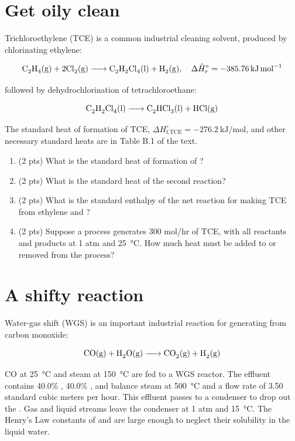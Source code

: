 \documentclass[11pt]{article}
\begin{document}
\section{Get oily clean}
\label{sec-3}
Trichloroethylene (TCE) is a common industrial cleaning solvent, produced by chlorinating ethylene:

\[\ce{C2H4 (g) + 2 Cl2 (g) -> C2H2Cl4 (l) + H2 (g)},\quad \Delta \hat{H}^{\circ}_{r} = \SI{-385.76}{\kilo\joule\per\mole} \]

\noindent followed by dehydrochlorination of tetrachloroethane:

\[ \ce{C2H2Cl4 (l) -> C2HCl3 (l) + HCl (g)}\]

\noindent The standard heat of formation of TCE, \(\Delta H^{\circ}_\text{f,TCE} = \SI{-276.2}{\kilo\joule\per\mole} \), and other necessary standard heats are in Table B.1 of the text.

\begin{enumerate}
\item (2 pts) What is the standard heat of formation of ?
\item (2 pts) What is the standard heat of the second reaction?
\item (2 pts) What is the standard enthalpy of the net reaction for making TCE from ethylene and ?
\item (2 pts) Suppose a process generates 300 mol/hr of TCE, with all reactants and products at 1 atm and \SI{25}{\celsius}.  How much heat must be added to or removed from the process?
\end{enumerate}
\section{A shifty reaction}
\label{sec-4}
Water-gas shift (WGS) is an important industrial reaction for generating  from carbon monoxide:

\[ \ce{ CO(g) + H2O (g) -> CO2 (g) + H2 (g) }\]

\noindent CO at \SI{25}{\celsius} and steam at \SI{150}{\celsius} are fed to a WGS reactor.  The effluent contains 40.0\% , 40.0\% , and balance steam at \SI{500}{\celsius} and a flow rate of 3.50 standard cubic meters per hour.  This effluent passes to a condenser to drop out the .  Gas and liquid streams leave the condenser at 1 atm and \SI{15}{\celsius}.  The Henry's Law constants of  and  are large enough to neglect their solubility in the liquid water.
\end{document}
